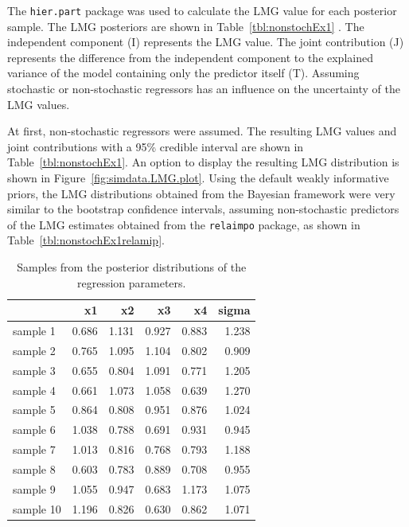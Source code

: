 \documentclass[11pt,a4paper,twoside]{book}
\newenvironment{knitrout}{}{} %
\begin{document}
The \texttt{hier.part} package was used to calculate the LMG value for each posterior sample. The LMG posteriors are shown in Table~\ref{tbl:nonstochEx1} . The independent component (I) represents the LMG value. The joint contribution (J) represents the difference from the independent component to the explained variance of the model containing only the predictor itself (T). Assuming stochastic or non-stochastic regressors has an influence on the uncertainty of the LMG values. 

At first, non-stochastic regressors were assumed. The resulting LMG values and joint contributions with a 95\% credible interval are shown in Table~\ref{tbl:nonstochEx1}. An option to display the resulting LMG distribution is shown in Figure~\ref{fig:simdata.LMG.plot}.  Using the default weakly informative priors, the LMG distributions obtained from the Bayesian framework were very similar to the bootstrap confidence intervals, assuming non-stochastic predictors of the LMG estimates obtained from the \texttt{relaimpo} package, as shown in Table~\ref{tbl:nonstochEx1relamip}. 





\begin{knitrout}
\color{fgcolor}\begin{table}

\caption{\label{tab:simdata.postsample2}Samples from the posterior distributions of the regression parameters.}
\centering
\begin{tabular}[t]{lrrrrr}
\toprule
  & x1 & x2 & x3 & x4 & sigma\\
\midrule
sample 1 & 0.686 & 1.131 & 0.927 & 0.883 & 1.238\\
sample 2 & 0.765 & 1.095 & 1.104 & 0.802 & 0.909\\
sample 3 & 0.655 & 0.804 & 1.091 & 0.771 & 1.205\\
sample 4 & 0.661 & 1.073 & 1.058 & 0.639 & 1.270\\
sample 5 & 0.864 & 0.808 & 0.951 & 0.876 & 1.024\\
sample 6 & 1.038 & 0.788 & 0.691 & 0.931 & 0.945\\
sample 7 & 1.013 & 0.816 & 0.768 & 0.793 & 1.188\\
sample 8 & 0.603 & 0.783 & 0.889 & 0.708 & 0.955\\
sample 9 & 1.055 & 0.947 & 0.683 & 1.173 & 1.075\\
sample 10 & 1.196 & 0.826 & 0.630 & 0.862 & 1.071\\
\bottomrule
\end{tabular}
\end{table}


\end{knitrout}
\end{document}
